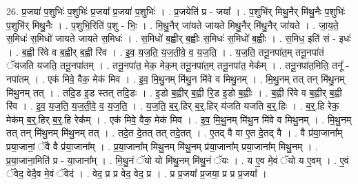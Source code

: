\documentclass[17pt]{extarticle}
\begin{document}
26. प्र॒जया॑ प॒शुभिः॑ प॒शुभिः॑ प्र॒जया᳚ प्र॒जया॑ प॒शुभिः॑ । . प्र॒जयेति॑ प्र - जया᳚ । . प॒शुभि॑र् मिथु॒नैर् मि॑थु॒नैः प॒शुभिः॑ प॒शुभि॑र् मिथु॒नैः । . प॒शुभि॒रिति॑ प॒शु - भिः॒ । . मि॒थु॒नैर् जा॑यते जायते मिथु॒नैर् मि॑थु॒नैर् जा॑यते । . जा॒य॒ते॒ स॒मिधः॑ स॒मिधो॑ जायते जायते स॒मिधः॑ । . स॒मिधो॑ ब॒ह्वीर् ब॒ह्वीः स॒मिधः॑ स॒मिधो॑ ब॒ह्वीः । . स॒मिध॒ इति॑ सं - इधः॑ । . ब॒ह्वी रि॑वे व ब॒ह्वीर् ब॒ह्वी रि॑व । . इ॒व॒ य॒ज॒ति॒ य॒ज॒ती॒वे॒ व॒ य॒ज॒ति॒ । . य॒ज॒ति॒ तनू॒नपा॑त॒म् तनू॒नपा॑तं ॅयजति यजति॒ तनू॒नपा॑तम् । . तनू॒नपा॑त॒ मेक॒ मेक॒म् तनू॒नपा॑त॒म् तनू॒नपा॑त॒ मेक᳚म् । . तनू॒नपा॑त॒मिति॒ तनू᳚ - नपा॑तम् । . एक॑ मिवे॒ वैक॒ मेक॑ मिव । . इ॒व॒ मि॒थु॒नम् मि॑थु॒न मि॑वे व मिथु॒नम् । . मि॒थु॒नम् तत् तन् मि॑थु॒नम् मि॑थु॒नम् तत् । . तदि॒ड इ॒ड स्तत् तदि॒डः । . इ॒डो ब॒ह्वीर् ब॒ह्वी रि॒ड इ॒डो ब॒ह्वीः । . ब॒ह्वी रि॑वे व ब॒ह्वीर् ब॒ह्वी रि॑व । . इ॒व॒ य॒ज॒ति॒ य॒ज॒ती॒वे॒ व॒ य॒ज॒ति॒ । . य॒ज॒ति॒ ब॒र्॒.हिर् ब॒र्॒.हिर् य॑जति यजति ब॒र्॒.हिः । . ब॒र्॒.हि रेक॒ मेक॑म् ब॒र्॒.हिर् ब॒र्॒.हि रेक᳚म् । . एक॑ मिवे॒ वैक॒ मेक॑ मिव । . इ॒व॒ मि॒थु॒नम् मि॑थु॒न मि॑वे व मिथु॒नम् । . मि॒थु॒नम् तत् तन् मि॑थु॒नम् मि॑थु॒नम् तत् । . तदे॒त दे॒तत् तत् तदे॒तत् । . ए॒तद् वै वा ए॒त दे॒तद् वै । . वै प्र॑या॒जाना᳚म् प्रया॒जानां॒ ॅवै वै प्र॑या॒जाना᳚म् । . प्र॒या॒जाना᳚म् मिथु॒नम् मि॑थु॒नम् प्र॑या॒जाना᳚म् प्रया॒जाना᳚म् मिथु॒नम् । . प्र॒या॒जाना॒मिति॑ प्र - या॒जाना᳚म् । . मि॒थु॒नं ॅयो यो मि॑थु॒नम् मि॑थु॒नं ॅयः । . य ए॒व मे॒वं ॅयो य ए॒वम् । . ए॒वं ॅवेद॒ वेदै॒व मे॒वं ॅवेद॑ । . वेद॒ प्र प्र वेद॒ वेद॒ प्र । . प्र प्र॒जया᳚ प्र॒जया॒ प्र प्र प्र॒जया᳚ । \newline
\end{document}
